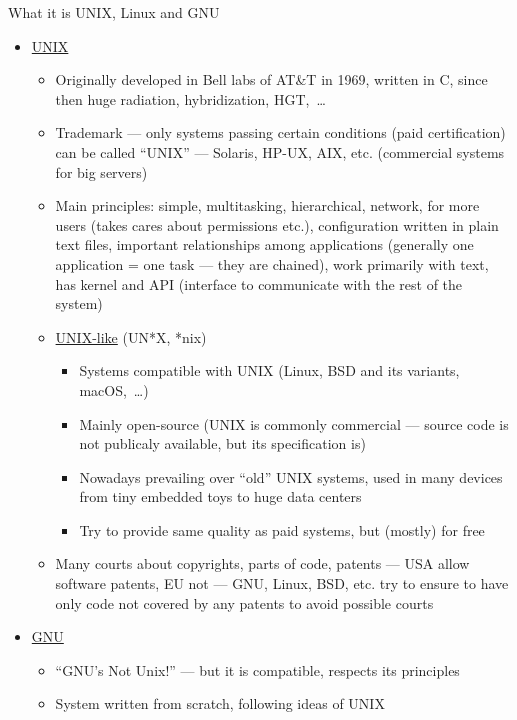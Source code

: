 \documentclass[compress, ucs, xelatex, 11pt, xcolor=svgnames, aspectratio=169,
	hyperref={
		bookmarks=true,
		unicode=true,
		colorlinks=true,
		pdftitle={Linux, command line and MetaCentrum},
		plainpages=false,
		pdfauthor={Vojtech Zeisek},
		pdfsubject={Course about use of Linux command line, writing shell scripts and using MetaCentrum of CESNET},
		pdfcreator={XeLaTeX},
		pdfkeywords={Linux, GNU, BASH, shell, command line, MetaCentrum},
		linkcolor=DarkRed, %
		anchorcolor=DarkBlue, %
		citecolor=Indigo, %
		filecolor=NavyBlue, %
		menucolor=DarkMagenta, %
		urlcolor=DarkBlue, %
		pdftex},
	url={hyphens, lowtilde} %
	]{beamer}
\begin{document}
\begin{frame}[allowframebreaks]{What it is UNIX, Linux and GNU}
	\begin{itemize}
		\item \href{https://en.wikipedia.org/wiki/Unix}{UNIX}
		\begin{itemize}
			\item Originally developed in Bell labs of AT\&T in 1969, written in C, since then  huge radiation, hybridization, HGT,~\ldots
			\item Trademark --- only systems passing certain conditions (paid certification) can be called \enquote{UNIX} --- Solaris, HP-UX, AIX, etc. (commercial systems for big servers)
			\item Main principles: simple, multitasking, hierarchical, network, for more users (takes cares about permissions etc.), configuration written in plain text files, important relationships among applications (generally one application = one task --- they are chained), work primarily with text, has kernel and API (interface to communicate with the rest of the system)
			\item \href{https://en.wikipedia.org/wiki/Unix-like}{UNIX-like} (UN*X, *nix)
			\begin{itemize}
				\item Systems compatible with UNIX (Linux, BSD and its variants, macOS,~\ldots)
				\item Mainly open-source (UNIX is commonly commercial --- source code is not publicaly available, but its specification is)
				\item Nowadays prevailing over \enquote{old} UNIX systems, used in many devices from tiny embedded toys to huge data centers
				\item Try to provide same quality as paid systems, but (mostly) for free
			\end{itemize}
			\item Many courts about copyrights, parts of code, patents --- USA allow software patents, EU not --- GNU, Linux, BSD, etc. try to ensure to have only code not covered by any patents to avoid possible courts
		\end{itemize}
		\item \href{https://www.gnu.org/}{GNU}
		\begin{itemize}
			\item \enquote{GNU's Not Unix!} --- but it is compatible, respects its principles
			\item System written from scratch, following ideas of UNIX

\end{itemize}
\end{itemize}
\end{frame}
\end{document}
